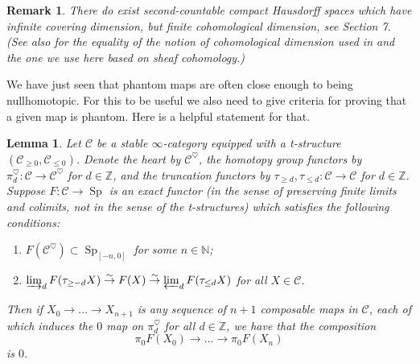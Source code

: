 \documentclass[12pt]{article}
\newtheorem{lemma}[theorem]{Lemma}
\newtheorem{remark}[theorem]{Remark}
\newcommand{\on}{\operatorname}
\newcommand{\heart}{\heartsuit}
\begin{document}
\begin{remark}
There do exist second-countable compact Hausdorff spaces which have infinite covering dimension, but finite cohomological dimension, see \cite{DranishnikovDimension} Section 7.  (See also \cite{GrothendieckTohoku} for the equality of the notion of cohomological dimension used in \cite{DranishnikovDimension} and the one we use here based on sheaf cohomology.)
\end{remark}

We have just seen that phantom maps are often close enough to being nullhomotopic.  For this to be useful we also need to give criteria for proving that a given map is phantom.  Here is a helpful statement for that.

\begin{lemma}\label{tstructureargument}
Let $\mathcal{C}$ be a stable $\infty$-category equipped with a t-structure $(\mathcal{C}_{\geq 0},\mathcal{C}_{\leq 0})$.  Denote the heart by $\mathcal{C}^\heart$, the homotopy group functors by $\pi^\heart_d:\mathcal{C}\to\mathcal{C}^\heart$ for $d\in\mathbb{Z}$, and the truncation functors by $\tau_{\geq d},\tau_{\leq d}:\mathcal{C}\to\mathcal{C}$ for $d\in\mathbb{Z}$.  Suppose $F:\mathcal{C}\to\on{Sp}$ is an exact functor (in the sense of preserving finite limits and colimits, not in the sense of the t-structures) which satisfies the following conditions:

\begin{enumerate}
\item $F(\mathcal{C}^{\heart}) \subset \on{Sp}_{[-n,0]}$
for some $n\in\mathbb{N}$;
\item $\varinjlim_d F(\tau_{\geq -d}X)\overset{\sim}{\rightarrow} F(X)\overset{\sim}{\rightarrow} \varprojlim_d F(\tau_{\leq d}X)$ for all $X\in\mathcal{C}$.
\end{enumerate}

Then if $X_0\to\ldots\to X_{n+1}$ is any sequence of $n+1$ composable maps in $\mathcal{C}$, each of which induces the $0$ map on $\pi_d^\heart$ for all $d\in\mathbb{Z}$, we have that the composition
$$\pi_0 F(X_0)\to\ldots \to \pi_0 F(X_n)$$
is $0$.
\end{lemma}
\end{document}
